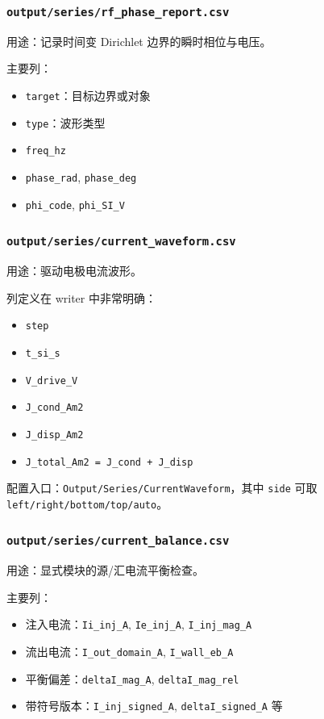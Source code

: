 \documentclass[11pt,a4paper]{ctexart}
\newcommand{\code}[1]{\texttt{#1}}
\newcommand{\file}[1]{\texttt{#1}}
\begin{document}
\subsubsection{\file{output/series/rf\_phase\_report.csv}}

用途：记录时间变 Dirichlet 边界的瞬时相位与电压。

主要列：

\begin{itemize}
  \item \code{target}：目标边界或对象
  \item \code{type}：波形类型
  \item \code{freq\_hz}
  \item \code{phase\_rad}, \code{phase\_deg}
  \item \code{phi\_code}, \code{phi\_SI\_V}
\end{itemize}

\subsubsection{\file{output/series/current\_waveform.csv}}

用途：驱动电极电流波形。

列定义在 writer 中非常明确：

\begin{itemize}
  \item \code{step}
  \item \code{t\_si\_s}
  \item \code{V\_drive\_V}
  \item \code{J\_cond\_Am2}
  \item \code{J\_disp\_Am2}
  \item \code{J\_total\_Am2 = J\_cond + J\_disp}
\end{itemize}

配置入口：\code{Output/Series/CurrentWaveform}，其中 \code{side} 可取 \code{left/right/bottom/top/auto}。

\subsubsection{\file{output/series/current\_balance.csv}}

用途：显式模块的源/汇电流平衡检查。

主要列：

\begin{itemize}
  \item 注入电流：\code{Ii\_inj\_A}, \code{Ie\_inj\_A}, \code{I\_inj\_mag\_A}
  \item 流出电流：\code{I\_out\_domain\_A}, \code{I\_wall\_eb\_A}
  \item 平衡偏差：\code{deltaI\_mag\_A}, \code{deltaI\_mag\_rel}
  \item 带符号版本：\code{I\_inj\_signed\_A}, \code{deltaI\_signed\_A} 等
\end{itemize}
\end{document}
